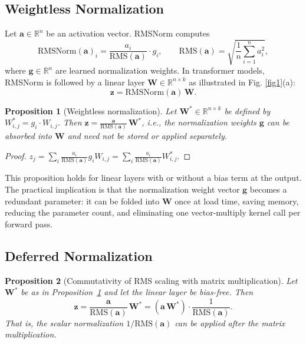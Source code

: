 \documentclass{article}
\newtheorem{proposition}{Proposition}
\begin{document}
\subsection{Weightless Normalization}
Let $\mathbf{a} \in \mathbb{R}^n$ be an activation vector. RMSNorm computes
\[
  \mathrm{RMSNorm}(\mathbf{a})_i = \frac{a_i}{\mathrm{RMS}(\mathbf{a})} \cdot g_i,
  \qquad
  \mathrm{RMS}(\mathbf{a}) = \sqrt{\frac{1}{n}\sum_{i=1}^n a_i^2},
\]
where $\mathbf{g} \in \mathbb{R}^n$ are learned normalization weights.
In transformer models, RMSNorm is followed by a linear layer $\mathbf{W} \in \mathbb{R}^{n \times k}$  as illustrated in Fig. \ref{fig1}(a):
\[
  \mathbf{z} = \mathrm{RMSNorm}(\mathbf{a})\, \mathbf{W}.
\]

\begin{proposition}[Weightless normalization]\label{prop:weightless}
Let $\mathbf{W}^* \in \mathbb{R}^{n \times k}$ be defined by $W^*_{i,j} = g_i \cdot W_{i,j}$.
Then $\mathbf{z} = \frac{\mathbf{a}}{\mathrm{RMS}(\mathbf{a})}\, \mathbf{W}^*$, i.e.,
the normalization weights $\mathbf{g}$ can be absorbed into $\mathbf{W}$ and need not
be stored or applied separately.
\end{proposition}

\begin{proof}
$z_j = \sum_i \frac{a_i}{\mathrm{RMS}(\mathbf{a})} g_i W_{i,j}
     = \sum_i \frac{a_i}{\mathrm{RMS}(\mathbf{a})} W^*_{i,j} $.
\end{proof}

This proposition holds for linear layers with or without a bias term at the output.
The practical implication is that the normalization weight vector $\mathbf{g}$ becomes
a redundant parameter: it can be folded into $\mathbf{W}$ once at load time, saving
memory, reducing the parameter count, and eliminating one vector-multiply kernel call
per forward pass.

\subsection{Deferred Normalization}

\begin{proposition}[Commutativity of RMS scaling with matrix multiplication]\label{prop:commute}
Let $\mathbf{W}^*$ be as in Proposition~\ref{prop:weightless} and let the linear
layer be bias-free. Then
\[
  \mathbf{z}
  = \frac{\mathbf{a}}{\mathrm{RMS}(\mathbf{a})}\,\mathbf{W}^*
  = (\mathbf{a}\,\mathbf{W}^*)\cdot \frac{1}{\mathrm{RMS}(\mathbf{a})}.
\]
That is, the scalar normalization $1/\mathrm{RMS}(\mathbf{a})$ can be applied
\emph{after} the matrix multiplication.
\end{proposition}
\end{document}
